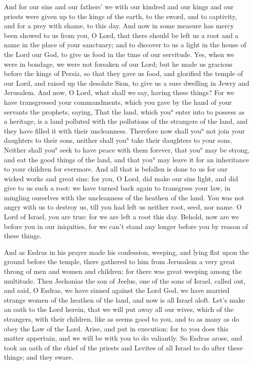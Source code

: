 {And for our sins and our fathers’ we with our kindred and our kings and our priests were given up to the kings of the earth, to the sword, and to captivity, and for a prey with shame, to this day.
And now in some measure has mercy been showed to us from you, O Lord, that there should be left us a root and a name in the place of your sanctuary;
and to discover to us a light in the house of the Lord our God,
{} to give us food in the time of our servitude.
Yes, when we were in bondage, we were not forsaken of our Lord; but he made us gracious before the kings of Persia, so that they gave us food,
and glorified the temple of our Lord, and raised up the desolate Sion, to give us a sure dwelling in Jewry and Jerusalem.
And now, O Lord, what shall we say, having these things? For we have transgressed your commandments, which you gave by the hand of your servants the prophets, saying,
That the land, which you° enter into to possess as a heritage, is a land polluted with the pollutions of the strangers of the land, and they have filled it with their uncleanness.
Therefore now shall you° not join your daughters to their sons, neither shall you° take their daughters to your sons.
Neither shall you° seek to have peace with them forever, that you° may be strong, and eat the good things of the land, and that you° may leave it for an inheritance to your children for evermore.
And all that is befallen is done to us for our wicked works and great sins: for you, O Lord, did make our sins light,
and did give to us such a root:
{} we have turned back again to transgress your law, in mingling ourselves with the uncleanness of the heathen of the land.
 You was not angry with us to destroy us, till you had left us neither root, seed, nor name.
O Lord of Israel, you are true: for we are left a root this day.
Behold, now are we before you in our iniquities, for we can’t stand any longer before you by reason of these things.
\par }{\PP {} And as Esdras in his prayer made his confession, weeping, and lying flat upon the ground before the temple, there gathered to him from Jerusalem a very great throng of men and women and children: for there was great weeping among the multitude.
Then Jechonias the son of Jeelus, one of the sons of Israel, called out, and said, O Esdras, we have sinned against the Lord God, we have married strange women of the heathen of the land, and now is all Israel
 aloft.
Let’s make an oath to the Lord herein, that we will put away all our wives, which
{} of the strangers, with their children,
like as seems good to you, and to as many as do obey the Law of the Lord.
Arise, and put in execution: for to you does this matter appertain, and we will be with you to do valiantly.
So Esdras arose, and took an oath of the chief of the priests and Levites of all Israel to do after these things; and
{} they sware.

}
